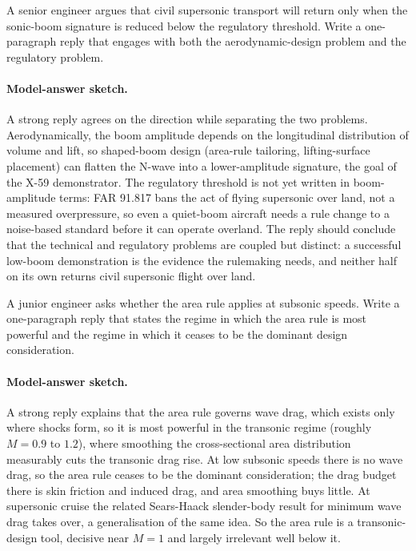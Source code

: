 \begin{exercise}
A senior engineer argues that civil supersonic transport will
return only when the sonic-boom signature is reduced below the
regulatory threshold. Write a one-paragraph reply that engages
with both the aerodynamic-design problem and the regulatory
problem.
\paragraph{Model-answer sketch.} A strong reply agrees on the
direction while separating the two problems. Aerodynamically, the boom
amplitude depends on the longitudinal distribution of volume and lift,
so shaped-boom design (area-rule tailoring, lifting-surface placement)
can flatten the N-wave into a lower-amplitude signature, the goal of
the X-59 demonstrator. The regulatory threshold is not yet written in
boom-amplitude terms: FAR 91.817 bans the act of flying supersonic
over land, not a measured overpressure, so even a quiet-boom aircraft
needs a rule change to a noise-based standard before it can operate
overland. The reply should conclude that the technical and regulatory
problems are coupled but distinct: a successful low-boom demonstration
is the evidence the rulemaking needs, and neither half on its own
returns civil supersonic flight over land.
\end{exercise}

\begin{exercise}
A junior engineer asks whether the area rule applies at subsonic
speeds. Write a one-paragraph reply that states the regime in
which the area rule is most powerful and the regime in which it
ceases to be the dominant design consideration.
\paragraph{Model-answer sketch.} A strong reply explains that the area
rule governs wave drag, which exists only where shocks form, so it is
most powerful in the transonic regime (roughly $M = 0.9$ to $1.2$),
where smoothing the cross-sectional area distribution measurably cuts
the transonic drag rise. At low subsonic speeds there is no wave drag,
so the area rule ceases to be the dominant consideration; the drag
budget there is skin friction and induced drag, and area smoothing
buys little. At supersonic cruise the related Sears-Haack slender-body
result for minimum wave drag takes over, a generalisation of the same
idea. So the area rule is a transonic-design tool, decisive near
$M = 1$ and largely irrelevant well below it.
\end{exercise}

